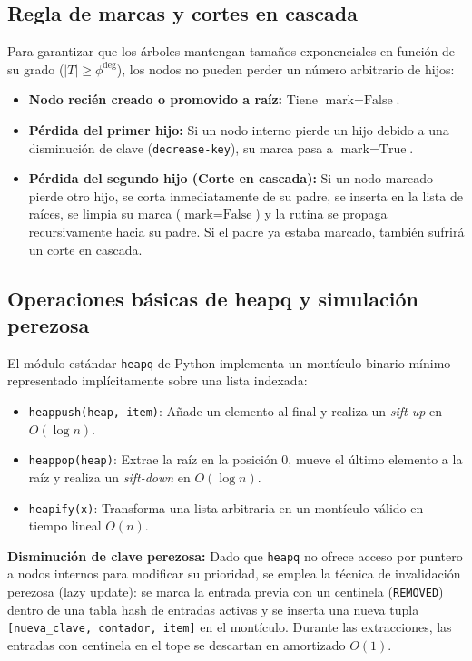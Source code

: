 \subsection{Regla de marcas y cortes en cascada}
Para garantizar que los árboles mantengan tamaños exponenciales en función de su grado ($|T| \ge \phi^{\text{deg}}$), los nodos no pueden perder un número arbitrario de hijos:
\begin{itemize}
    \item \textbf{Nodo recién creado o promovido a raíz:} Tiene $\text{mark} = \text{False}$.
    \item \textbf{Pérdida del primer hijo:} Si un nodo interno pierde un hijo debido a una disminución de clave (\texttt{decrease-key}), su marca pasa a $\text{mark} = \text{True}$.
    \item \textbf{Pérdida del segundo hijo (Corte en cascada):} Si un nodo marcado pierde otro hijo, se corta inmediatamente de su padre, se inserta en la lista de raíces, se limpia su marca ($\text{mark} = \text{False}$) y la rutina se propaga recursivamente hacia su padre. Si el padre ya estaba marcado, también sufrirá un corte en cascada.
\end{itemize}

\subsection{Operaciones básicas de heapq y simulación perezosa}
El módulo estándar \texttt{heapq} de Python implementa un montículo binario mínimo representado implícitamente sobre una lista indexada:
\begin{itemize}
    \item \texttt{heappush(heap, item)}: Añade un elemento al final y realiza un \textit{sift-up} en $O(\log n)$.
    \item \texttt{heappop(heap)}: Extrae la raíz en la posición 0, mueve el último elemento a la raíz y realiza un \textit{sift-down} en $O(\log n)$.
    \item \texttt{heapify(x)}: Transforma una lista arbitraria en un montículo válido en tiempo lineal $O(n)$.
\end{itemize}
\textbf{Disminución de clave perezosa:} Dado que \texttt{heapq} no ofrece acceso por puntero a nodos internos para modificar su prioridad, se emplea la técnica de invalidación perezosa (lazy update): se marca la entrada previa con un centinela (\texttt{REMOVED}) dentro de una tabla hash de entradas activas y se inserta una nueva tupla \texttt{[nueva\_clave, contador, item]} en el montículo. Durante las extracciones, las entradas con centinela en el tope se descartan en amortizado $O(1)$.
